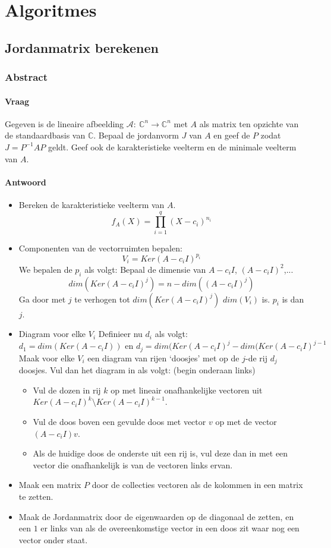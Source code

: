 \documentclass[main.tex]{subfiles}
\begin{document}
\chapter{Algoritmes}
\label{cha:algoritmes}

\section{Jordanmatrix berekenen}

\subsection*{Abstract}

\subsubsection*{Vraag}
Gegeven is de lineaire afbeelding $\mathcal{A}:\ \mathbb{C}^{n} \rightarrow \mathbb{C}^{n}$ met $A$ als matrix ten opzichte van de standaardbasis van $\mathbb{C}$.
Bepaal de jordanvorm $J$ van $A$ en geef de $P$ zodat $J=P^{-1}AP$ geldt.
Geef ook de karakteristieke veelterm en de minimale veelterm van $A$.
\subsubsection*{Antwoord}
\begin{itemize}
\item Bereken de karakteristieke veelterm van $A$.
  \[ f_{A}(X) = \prod_{i=1}^{q}(X-c_{i})^{n_{i}} \]
\item Componenten van de vectorruimten bepalen:
  \[ V_{i} = Ker(A-c_{i}I)^{p_{i}} \]
  We bepalen de $p_{i}$ als volgt:
  Bepaal de dimensie van $A-c_{i}I$, $(A-c_{i}I)^{2}$,...
  \[ dim(Ker(A-c_{i}I)^{j}) = n-dim((A-c_{i}I)^{j}) \]
  Ga door met $j$ te verhogen tot $dim(Ker(A-c_{i}I)^{j})$ $dim(V_{i})$ is.
  $p_{i}$ is dan $j$.
\item Diagram voor elke $V_{i}$
  Definieer nu $d_{i}$ als volgt:
  \[ d_{1} = dim(Ker(A-c_{i}I)) \text{ en } d_{j} = dim(Ker(A-c_{i}I)^{j}-dim(Ker(A-c_{i}I)^{j-1} \]
  Maak voor elke $V_{i}$ een diagram van rijen `doosjes' met op de $j$-de rij $d_{j}$ doosjes.
  Vul dan het diagram in als volgt: (begin onderaan links)
  \begin{itemize}
  \item Vul de dozen in rij $k$ op met lineair onafhankelijke vectoren uit $Ker(A-c_{i}I)^{k}\setminus Ker(A-c_{i}I)^{k-1}$.
  \item Vul de doos boven een gevulde doos met vector $v$ op met de vector $(A-c_{i}I)v$.
  \item Als de huidige doos de onderste uit een rij is, vul deze dan in met een vector die onafhankelijk is van de vectoren links ervan.
  \end{itemize}
\item Maak een matrix $P$ door de collecties vectoren als de kolommen in een matrix te zetten.
\item Maak de Jordanmatrix door de eigenwaarden op de diagonaal de zetten, en een $1$ er links van als de overeenkomstige vector in een doos zit waar nog een vector onder staat.
\end{itemize}
\end{document}

